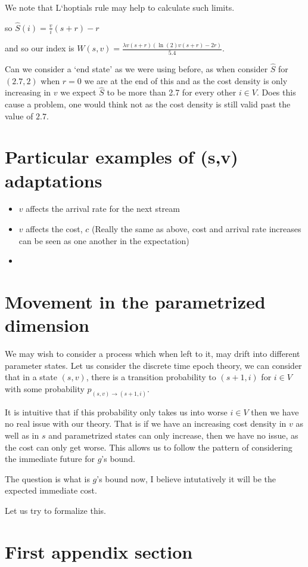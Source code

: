 \documentclass[a4paper,10pt]{article}
\theoremstyle{definition}
\theoremstyle{definition}
\theoremstyle{remark}
\theoremstyle{definition}
\begin{document}
We note that L`hoptials rule may help to calculate such limits. 

so $\hat{S}(i)=\frac{v}{i} (s+r) -r$

and so our index is $W(s,v)=\frac{\lambda v (s+r) (\ln (2) v (s+r) -2r)}{5.4}$.

Can we consider a `end state' as we were using before, as when consider $\hat{S}$ for $(2.7,2)$ when $r=0$ we are at the end of this and as the cost density is only increasing in $v$ we expect $\hat{S}$ to be more than 2.7 for every other $i \in V$. Does this cause a problem, one would think not as the cost density is still valid past the value of $2.7$.

\section{Particular examples of (s,v) adaptations}
\begin{itemize}
\item $v$ affects the arrival rate for the next stream
\item $v$ affects the cost, $c$ (Really the same as above, cost and arrival rate increases can be seen as one another in the expectation)
\item  
\end{itemize}

\section{Movement in the parametrized dimension}
We may wish to consider a process which when left to it, may drift into different parameter states. Let us consider the discrete time epoch theory, we can consider that in a state $(s,v)$, there is a transition probability to $(s+1,i)$ for $i \in V$ with some probability $p_{(s,v) \rightarrow (s+1,i)}$.

It is intuitive that if this probability only takes us into worse $i \in V$ then we have no real issue with our theory. That is if we have an increasing cost density in $v$ as well as in $s$ and parametrized states can only increase, then we have no issue, as the cost can only get worse. This allows us to follow the pattern of considering the immediate future for $g$'s bound.

The question is what is $g$'s bound now, I believe intutatively it will be the expected immediate cost.

Let us try to formalize this.



\newpage
\appendix
{}
\appendixpage
\addappheadtotoc
\section{First appendix section}
\end{document}
